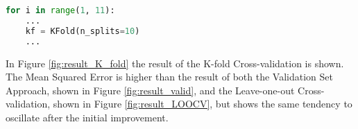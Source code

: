 \begin{lstlisting}[language=Python, label=lst:K_fold, caption=K-fold Cross-validation loop]
for i in range(1, 11):
	...
	kf = KFold(n_splits=10) 
	...
\end{lstlisting}

In Figure \ref{fig:result_K_fold} the result of the K-fold Cross-validation is shown. The Mean Squared Error is higher than the result of both the Validation Set Approach, shown in Figure \ref{fig:result_valid}, and the Leave-one-out Cross-validation, shown in Figure \ref{fig:result_LOOCV}, but shows the same tendency to oscillate after the initial improvement. 

